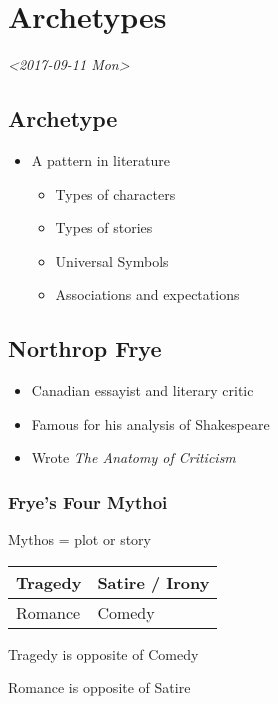 \documentclass[11pt]{article}
\date{\today}
\title{}
\begin{document}
\section*{Archetypes}
\label{sec:org02c12eb}
\textit{<2017-09-11 Mon>}

\subsection*{Archetype}
\label{sec:orge3a8ff3}
\begin{itemize}
\item A pattern in literature
\begin{itemize}
\item Types of characters
\item Types of stories
\item Universal Symbols
\item Associations and expectations
\end{itemize}
\end{itemize}

\subsection*{Northrop Frye}
\label{sec:org6f9d06d}
\begin{itemize}
\item Canadian essayist and literary critic
\item Famous for his analysis of Shakespeare
\item Wrote \emph{The Anatomy of Criticism}
\end{itemize}

\subsubsection*{Frye's Four Mythoi}
\label{sec:org9e03475}
Mythos = plot or story

\begin{center}
\begin{tabular}{ll}
Tragedy & Satire / Irony\\
\hline
Romance & Comedy\\
\end{tabular}
\end{center}

Tragedy is opposite of Comedy

Romance is opposite of Satire
\end{document}

